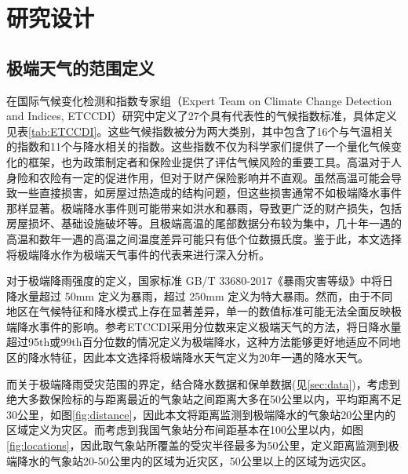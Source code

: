 \chapter{研究设计}\label{chap:3}
\section{极端天气的范围定义}\label{sec:def}

在国际气候变化检测和指数专家组（Expert Team on Climate Change Detection and Indices, ETCCDI）研究\citep{alexander2006global}中定义了27个具有代表性的气候指数标准，具体定义见表\ref{tab:ETCCDI}。这些气候指数被分为两大类别，其中包含了16个与气温相关的指数和11个与降水相关的指数。这些指数不仅为科学家们提供了一个量化气候变化的框架，也为政策制定者和保险业提供了评估气候风险的重要工具。高温对于人身险\citep{马姝瑞2014}和农险\citep{梁来存2019气温天气指数保险的费率厘定}有一定的促进作用，但对于财产保险影响并不直观。虽然高温可能会导致一些直接损害，如房屋过热造成的结构问题，但这些损害通常不如极端降水事件那样显著。极端降水事件则可能带来如洪水和暴雨，导致更广泛的财产损失，包括房屋损坏、基础设施破坏等。且极端高温的尾部数据分布较为集中\citep{尹红2019基于}，几十年一遇的高温和数年一遇的高温之间温度差异可能只有低个位数摄氏度。鉴于此，本文选择将极端降水作为极端天气事件的代表来进行深入分析。


对于极端降雨强度的定义，国家标准 GB/T 33680-2017《暴雨灾害等级》中将日降水量超过 50mm 定义为暴雨，超过 250mm 定义为特大暴雨。然而，由于不同地区在气候特征和降水模式上存在显著差异，单一的数值标准可能无法全面反映极端降水事件的影响。参考ETCCDI采用分位数来定义极端天气的方法，将日降水量超过95th或99th百分位数的情况定义为极端降水，这种方法能够更好地适应不同地区的降水特征，因此本文选择将极端降水天气定义为20年一遇的降水天气。

而关于极端降雨受灾范围的界定，结合降水数据和保单数据(见\ref{sec:data})，考虑到绝大多数保险标的与距离最近的气象站之间距离大多在50公里以内，平均距离不足30公里，如图\ref{fig:distance}，因此本文将距离监测到极端降水的气象站20公里内的区域定义为灾区。而考虑到我国气象站分布间距基本在100公里以内，如图\ref{fig:locations}，因此取气象站所覆盖的受灾半径最多为50公里，定义距离监测到极端降水的气象站20-50公里内的区域为近灾区，50公里以上的区域为远灾区。

